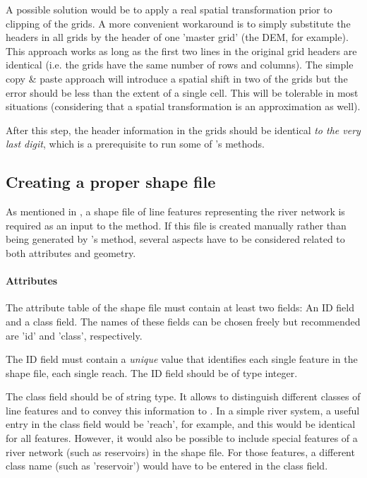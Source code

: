 A possible solution would be to apply a real spatial transformation prior to clipping of the grids. A more convenient workaround is to simply substitute the headers in all grids by the header of one 'master grid' (the DEM, for example). This approach works as long as the first two lines in the original grid headers are identical (i.e. the grids have the same number of rows and columns). The simple copy \& paste approach will introduce a spatial shift in two of the grids but the error should be less than the extent of a single cell. This will be tolerable in most situations (considering that a spatial transformation is an approximation as well).

After this step, the header information in the grids should be identical \emph{to the very last digit}, which is a prerequisite to run some of 's methods.

\subsection{Creating a proper shape file} \label{sec:topocatch:hints-shape}

As mentioned in , a shape file of line features representing the river network is required as an input to the  method. If this file is created manually rather than being generated by 's  method, several aspects have to be considered related to both attributes and geometry.

\paragraph{Attributes}
The attribute table of the shape file must contain at least two fields: An ID field and a class field. The names of these fields can be chosen freely but recommended are 'id' and 'class', respectively.

The ID field must contain a \emph{unique} value that identifies each single feature in the shape file, \ie{} each single reach. The ID field should be of type integer.

The class field should be of string type. It allows to distinguish different classes of line features and to convey this information to . In a simple river system, a useful entry in the class field would be 'reach', for example, and this would be identical for all features. However, it would also be possible to include special features of a river network (such as reservoirs) in the shape file. For those features, a different class name (such as 'reservoir') would have to be entered in the class field.

